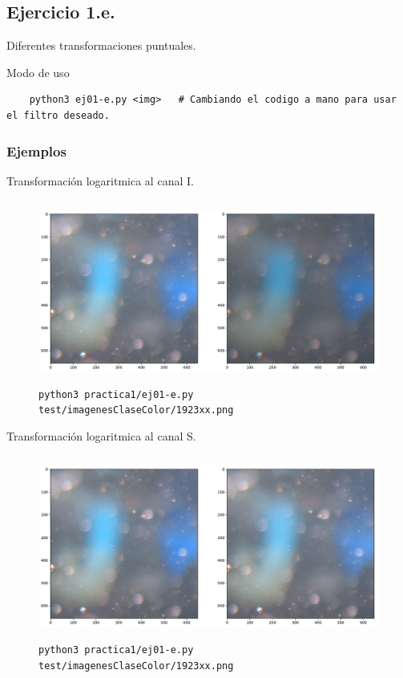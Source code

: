 \documentclass[11pt, spanish]{article}
\begin{document}
\subsection{Ejercicio 1.e.}

Diferentes transformaciones puntuales.

Modo de uso
\begin{verbatim}
    python3 ej01-e.py <img>   # Cambiando el codigo a mano para usar el filtro deseado.
\end{verbatim}

\subsubsection*{Ejemplos}
Transformación logaritmica al canal I.
\begin{figure}[H]
\centering
  \includegraphics[height=6cm]{informe-imgs/ej01-e-1.pdf}
  \caption{\texttt{python3 practica1/ej01-e.py test/imagenesClaseColor/1923xx.png}}
\end{figure}

Transformación logaritmica al canal S.
\begin{figure}[H]
\centering
  \includegraphics[height=6cm]{informe-imgs/ej01-e-2.pdf}
  \caption{\texttt{python3 practica1/ej01-e.py test/imagenesClaseColor/1923xx.png}}
\end{figure}
\end{document}
